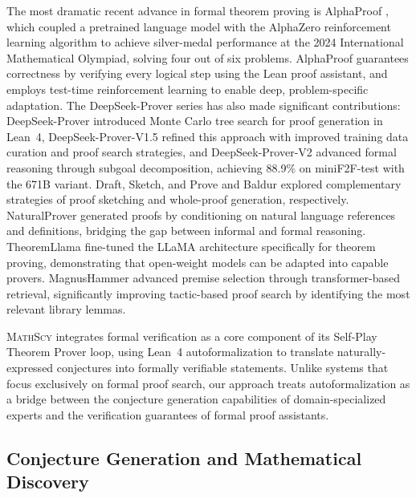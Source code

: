 \documentclass[11pt,a4paper]{article}
\newcommand{\mathscy}{\textsc{MathScy}}
\begin{document}
The most dramatic recent advance in formal theorem proving is AlphaProof \citep{trinh2024alphaproof}, which coupled a pretrained language model with the AlphaZero reinforcement learning algorithm to achieve silver-medal performance at the 2024 International Mathematical Olympiad, solving four out of six problems. AlphaProof guarantees correctness by verifying every logical step using the Lean proof assistant, and employs test-time reinforcement learning to enable deep, problem-specific adaptation. The DeepSeek-Prover series has also made significant contributions: DeepSeek-Prover \citep{xin2024deepseekprover} introduced Monte Carlo tree search for proof generation in Lean~4, DeepSeek-Prover-V1.5 \citep{xin2024deepseekproverv15} refined this approach with improved training data curation and proof search strategies, and DeepSeek-Prover-V2 \citep{xin2024deepseekproverv2} advanced formal reasoning through subgoal decomposition, achieving 88.9\% on miniF2F-test with the 671B variant. Draft, Sketch, and Prove \citep{jiang2023draft} and Baldur \citep{first2023baldur} explored complementary strategies of proof sketching and whole-proof generation, respectively. NaturalProver \citep{welleck2022naturalprover} generated proofs by conditioning on natural language references and definitions, bridging the gap between informal and formal reasoning. TheoremLlama \citep{chen2024theoremllama} fine-tuned the LLaMA architecture specifically for theorem proving, demonstrating that open-weight models can be adapted into capable provers. MagnusHammer \citep{mikula2024magnushammer} advanced premise selection through transformer-based retrieval, significantly improving tactic-based proof search by identifying the most relevant library lemmas.

\mathscy{} integrates formal verification as a core component of its Self-Play Theorem Prover loop, using Lean~4 autoformalization to translate naturally-expressed conjectures into formally verifiable statements. Unlike systems that focus exclusively on formal proof search, our approach treats autoformalization as a bridge between the conjecture generation capabilities of domain-specialized experts and the verification guarantees of formal proof assistants.

\subsection{Conjecture Generation and Mathematical Discovery}
\end{document}
